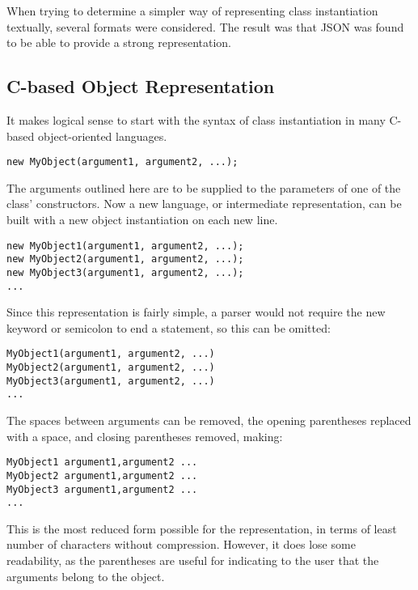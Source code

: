 When trying to determine a simpler way of representing class instantiation textually, several formats were considered. The result was that JSON was found to be able to provide a strong representation.
\subsection{C-based Object Representation}
It makes logical sense to start with the syntax of class instantiation in many C-based object-oriented languages.
\begin{verbatim}
new MyObject(argument1, argument2, ...);
\end{verbatim}
The arguments outlined here are to be supplied to the parameters of one of the class’ constructors. Now a new language, or intermediate representation, can be built with a new object instantiation on each new line.
\begin{verbatim}
new MyObject1(argument1, argument2, ...);
new MyObject2(argument1, argument2, ...);
new MyObject3(argument1, argument2, ...);
...
\end{verbatim}
Since this representation is fairly simple, a parser would not require the new keyword or semicolon to end a statement, so this can be omitted:
\begin{verbatim}
MyObject1(argument1, argument2, ...)
MyObject2(argument1, argument2, ...)
MyObject3(argument1, argument2, ...)
...
\end{verbatim}
The spaces between arguments can be removed, the opening parentheses replaced with a space, and closing parentheses removed, making:
\begin{verbatim}
MyObject1 argument1,argument2 ...
MyObject2 argument1,argument2 ...
MyObject3 argument1,argument2 ...
...
\end{verbatim}
This is the most reduced form possible for the representation, in terms of least number of characters without compression. However, it does lose some readability, as the parentheses are useful for indicating to the user that the arguments belong to the object.

